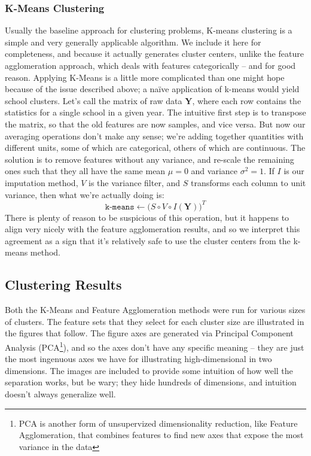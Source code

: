 \documentclass[paper.tex]{subfiles}
\begin{document}
	\subsubsection{K-Means Clustering}
	Usually the baseline approach for clustering problems, K-means clustering is a simple and very generally applicable algorithm. We include it here for completeness, and because it actually generates cluster centers, unlike the feature agglomeration approach, which deals with features categorically -- and for good reason. Applying K-Means is a little more complicated than one might hope because of the issue described above; a na\"{i}ve application of k-means would yield school clusters. Let's call the matrix of raw data $\mathbf{Y}$, where each row contains the statistics for a single school in a given year. The intuitive first step is to transpose the matrix, so that the old features are now samples, and vice versa. But now our averaging operations don't make any sense; we're adding together quantities with different units, some of which are categorical, others of which are continuous. The solution is to remove features without any variance, and re-scale the remaining ones such that they all have the same mean $\mu = 0$ and variance $\sigma^2 = 1$. If $I$ is our imputation method, $V$ is the variance filter, and $S$ transforms each column to unit variance, then what we're actually doing is:
	\[\texttt{k-means} \longleftarrow \Big(S \circ V \circ I (\mathbf{Y}) \Big)^T \]
	There is plenty of reason to be suspicious of this operation, but it happens to align very nicely with the feature agglomeration results, and so we interpret this agreement as a sign that it's relatively safe to use the cluster centers from the k-means method.
	
	\subsection{Clustering Results}
	Both the K-Means and Feature Agglomeration methods were run for various sizes of clusters. The feature sets that they select for each cluster size are illustrated in the figures that follow. The figure axes are generated via Principal Component Analysis (PCA\footnote{PCA is another form of unsupervized dimensionality reduction, like Feature Agglomeration, that combines features to find new axes that expose the most variance in the data}), and so the axes don't have any specific meaning -- they are just the most ingenuous axes we have for illustrating high-dimensional in two dimensions. The images are included to provide some intuition of how well the separation works, but be wary; they hide hundreds of dimensions, and intuition doesn't always generalize well.
	
\end{document}
